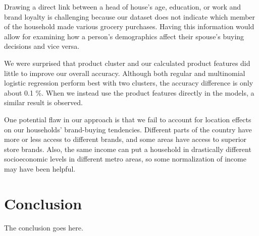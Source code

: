 \documentclass[conference]{IEEEtran}
\begin{document}
Drawing a direct link between a head of house’s age, education, or work and brand loyalty is challenging because our dataset does not indicate which member of the household made various grocery purchases. Having this information would allow for examining how a person’s demographics affect their spouse’s buying decisions and vice versa.


We were surprised that product cluster and our calculated product features did little to improve our overall accuracy. Although both regular and multinomial logistic regression perform best with two clusters, the accuracy difference is only about 0.1 \%. When we instead use the product features directly in the models, a similar result is observed.


One potential flaw in our approach is that we fail to account for location effects on our households’ brand-buying tendencies. Different parts of the country have more or less access to different brands, and some areas have access to superior store brands\cite{bronnenberg2016formation}. Also, the same income can put a household in drastically different socioeconomic levels in different metro areas, so some normalization of income may have been helpful. 


\section{Conclusion}
The conclusion goes here.












%


\end{document}
